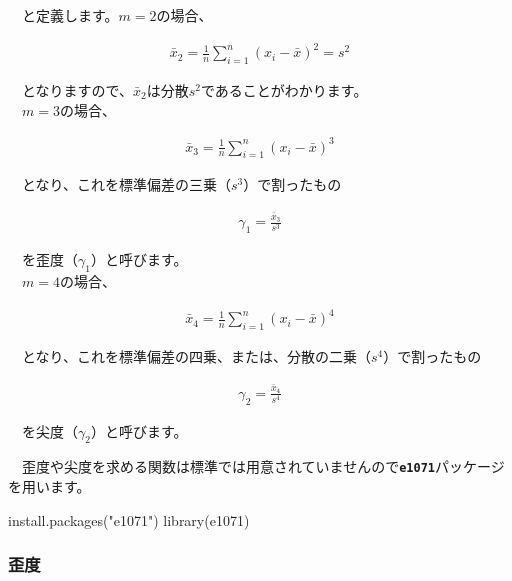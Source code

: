 \documentclass[
  12pt,
]{book}
\newenvironment{Shaded}{\begin{snugshade}}{\end{snugshade}}
\newcommand{\FunctionTok}[1]{\textcolor[rgb]{0.00,0.00,0.00}{#1}}
\newcommand{\NormalTok}[1]{#1}
\newcommand{\StringTok}[1]{\textcolor[rgb]{0.31,0.60,0.02}{#1}}
\begin{document}
　と定義します。\(m = 2\)の場合、

\begin{align}
  \bar{x}_2 = \frac{1}{n}\sum_{i = 1}^{n}(x_i - \bar{x})^2 = s^2 \label{eq:moment2}
\end{align}

　となりますので、\(\bar{x}_2\)は分散\(s^2\)であることがわかります。\\
　\(m = 3\)の場合、

\begin{align}
  \bar{x}_3 = \frac{1}{n}\sum_{i = 1}^{n}(x_i - \bar{x})^3 \label{eq:moment3}
\end{align}

　となり、これを標準偏差の三乗（\(s^3\)）で割ったもの

\begin{align}
  \gamma_1 = \frac{\bar{x}_3}{s^3} \label{eq:skewness}
\end{align}

　を歪度（\(\gamma_1\)）と呼びます。\\
　\(m = 4\)の場合、

\begin{align}
  \bar{x}_4 = \frac{1}{n}\sum_{i = 1}^{n}(x_i - \bar{x})^4  \label{eq:moment4}
\end{align}

　となり、これを標準偏差の四乗、または、分散の二乗（\(s^4\)）で割ったもの

\begin{align}
  \gamma_2 = \frac{\bar{x}_4}{s^4} \label{eq:kurtosise}
\end{align}

　を尖度（\(\gamma_2\)）と呼びます。

　歪度や尖度を求める関数は標準では用意されていませんので\textbf{\texttt{e1071}}パッケージを用います。

\begin{Shaded}
\begin{Highlighting}[numbers=left,,]
\FunctionTok{install.packages}\NormalTok{(}\StringTok{"e1071"}\NormalTok{)}
\FunctionTok{library}\NormalTok{(e1071)}
\end{Highlighting}
\end{Shaded}

\hypertarget{ux6b6aux5ea6}{%
\subsubsection*{\texorpdfstring{歪度}{歪度}}\label{ux6b6aux5ea6}}
\end{document}
